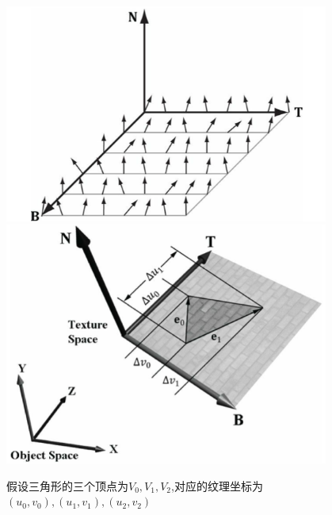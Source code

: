 \begin{center}
    \includegraphics[width=0.8\textwidth]{images/normal_map_tnb.png}
    \includegraphics[width=0.8\textwidth]{images/normal_map_tnb_in_object_space.png}
\end{center}
假设三角形的三个顶点为$V_{0},V_{1},V_{2}$,对应的纹理坐标为$(u_{0},v_{0}),(u_{1},v_{1}),(u_{2},v_{2})$

